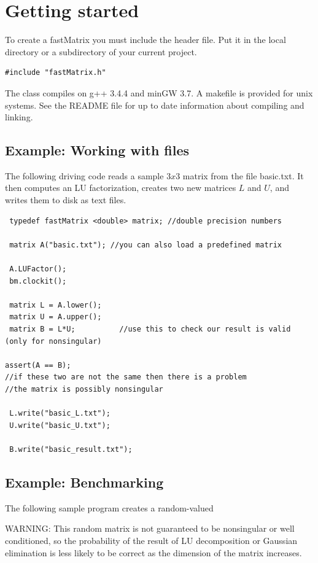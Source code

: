 \documentclass[10pt,fullpage]{article}
\begin{document}
\newpage

\section{Getting started}

To create a fastMatrix you must include the header file. Put it in
the local directory or a subdirectory of your current project.

\begin{verbatim}
#include "fastMatrix.h"
\end{verbatim}

The class compiles on g++ 3.4.4 and minGW 3.7. A makefile is
provided for unix systems. See the README file for up to date
information about compiling and linking.

\subsection {Example: Working with files}

The following driving code reads a sample $3x3$ matrix from the file
basic.txt. It then computes an LU factorization, creates two new
matrices $L$ and $U$, and writes them to disk as text files.

\begin{verbatim}
 typedef fastMatrix <double> matrix; //double precision numbers

 matrix A("basic.txt"); //you can also load a predefined matrix

 A.LUFactor();
 bm.clockit();

 matrix L = A.lower();
 matrix U = A.upper();
 matrix B = L*U;          //use this to check our result is valid (only for nonsingular)

assert(A == B);
//if these two are not the same then there is a problem
//the matrix is possibly nonsingular

 L.write("basic_L.txt");
 U.write("basic_U.txt");

 B.write("basic_result.txt");
\end{verbatim}

\newpage

\subsection {Example: Benchmarking}

The following sample program creates a random-valued

WARNING: This random matrix is not guaranteed to be nonsingular or
well conditioned, so the probability of the result of LU
decomposition or Gaussian elimination is less likely to be correct
as the dimension of the matrix increases.
\end{document}
